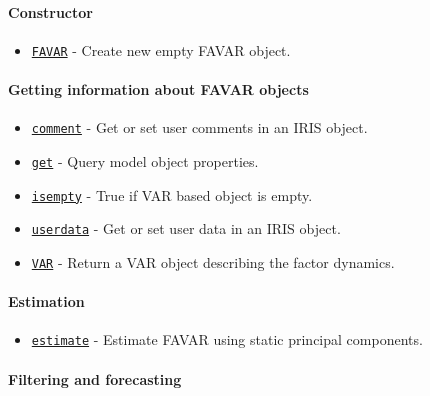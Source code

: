 

	\paragraph{Constructor}\label{constructor}

\begin{itemize}
\itemsep1pt\parskip0pt
\item
  \href{FAVAR/FAVAR}{\texttt{FAVAR}} - Create new empty FAVAR object.
\end{itemize}

\paragraph{Getting information about FAVAR
objects}\label{getting-information-about-favar-objects}

\begin{itemize}
\itemsep1pt\parskip0pt
\item
  \href{FAVAR/comment}{\texttt{comment}} - Get or set user comments in
  an IRIS object.
\item
  \href{FAVAR/get}{\texttt{get}} - Query model object properties.
\item
  \href{FAVAR/isempty}{\texttt{isempty}} - True if VAR based object is
  empty.
\item
  \href{FAVAR/userdata}{\texttt{userdata}} - Get or set user data in an
  IRIS object.
\item
  \href{FAVAR/VAR}{\texttt{VAR}} - Return a VAR object describing the
  factor dynamics.
\end{itemize}

\paragraph{Estimation}\label{estimation}

\begin{itemize}
\itemsep1pt\parskip0pt
\item
  \href{FAVAR/estimate}{\texttt{estimate}} - Estimate FAVAR using static
  principal components.
\end{itemize}

\paragraph{Filtering and forecasting}\label{filtering-and-forecasting}

